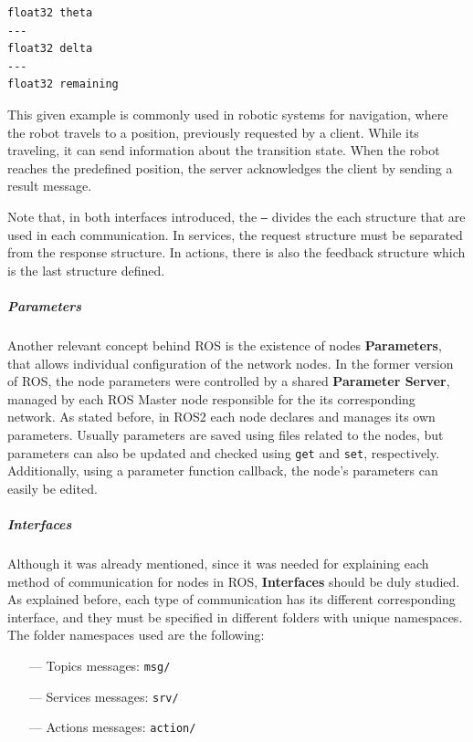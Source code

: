 \begin{verbatim}
float32 theta
---
float32 delta
---
float32 remaining
\end{verbatim}

This given example is commonly used in robotic systems for navigation, where the robot travels to a position, previously requested by a client. While its traveling, it can send information about the transition state. When the robot reaches the predefined position, the server acknowledges the client by sending a result message. 

Note that, in both interfaces introduced, the \texttt{---} divides the each structure that are used in each communication. In services, the request structure must be separated from the response structure. In actions, there is also the feedback structure which is the last structure defined.  
               
\subparagraph{Parameters}
               
Another relevant concept behind ROS is the existence of nodes \textbf{Parameters}, that allows individual configuration of the network nodes. In the former version of ROS, the node parameters were controlled by a shared \textbf{Parameter Server}, managed by each ROS Master node responsible for the its corresponding network. As stated before, in ROS2 each node declares and manages its own parameters. Usually parameters are saved using files related to the nodes, but parameters can also be updated and checked using \texttt{get} and \texttt{set}, respectively. Additionally, using a parameter function callback, the node's parameters can easily be edited.
               
\subparagraph{Interfaces}
               
Although it was already mentioned, since it was needed for explaining each method of communication for nodes in ROS, \textbf{Interfaces} should be duly studied.
As explained before, each type of communication has its different corresponding interface, and they must be specified in different folders with unique namespaces.
The folder namespaces used are the following:
\begin{itemize}
    \item[---]Topics messages: \texttt{msg/}
    \item[---]Services messages: \texttt{srv/}
    \item[---]Actions messages: \texttt{action/}
\end{itemize}
               
